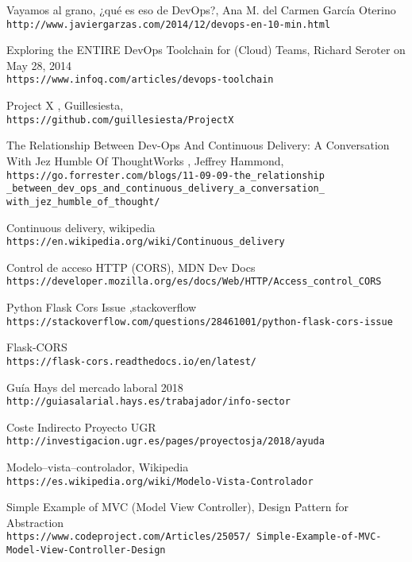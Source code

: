 \begin{thebibliography}{999}
 Vayamos al grano, ¿qué es eso de DevOps?,  Ana M. del Carmen García Oterino
\\\texttt{http://www.javiergarzas.com/2014/12/devops-en-10-min.html}

 Exploring the ENTIRE DevOps Toolchain for (Cloud) Teams,  Richard Seroter on May 28, 2014
\\\texttt{https://www.infoq.com/articles/devops-toolchain}

Project X , Guillesiesta,
\\\texttt{https://github.com/guillesiesta/ProjectX}

The Relationship Between Dev-Ops And Continuous Delivery: A Conversation With Jez Humble Of ThoughtWorks , Jeffrey Hammond,
\\\texttt{https://go.forrester.com/blogs/11-09-09-the\_relationship
\_between\_dev\_ops\_and\_continuous\_delivery\_a\_conversation\_
with\_jez\_humble\_of\_thought/}

Continuous delivery, wikipedia
\\\texttt{https://en.wikipedia.org/wiki/Continuous\_delivery}

Control de acceso HTTP (CORS), MDN Dev Docs
\\\texttt{https://developer.mozilla.org/es/docs/Web/HTTP/Access\_control\_CORS}


Python Flask Cors Issue ,stackoverflow
\\\texttt{https://stackoverflow.com/questions/28461001/python-flask-cors-issue}

Flask-CORS
\\\texttt{https://flask-cors.readthedocs.io/en/latest/}

Guía Hays del mercado laboral 2018
\\\texttt{http://guiasalarial.hays.es/trabajador/info-sector}

Coste Indirecto Proyecto UGR
\\\texttt{http://investigacion.ugr.es/pages/proyectosja/2018/ayuda}


Modelo–vista–controlador, Wikipedia
\\\texttt{https://es.wikipedia.org/wiki/Modelo-Vista-Controlador}

Simple Example of MVC (Model View Controller), Design Pattern for Abstraction
\\\texttt{https://www.codeproject.com/Articles/25057/
Simple-Example-of-MVC-Model-View-Controller-Design}


\end{thebibliography}
